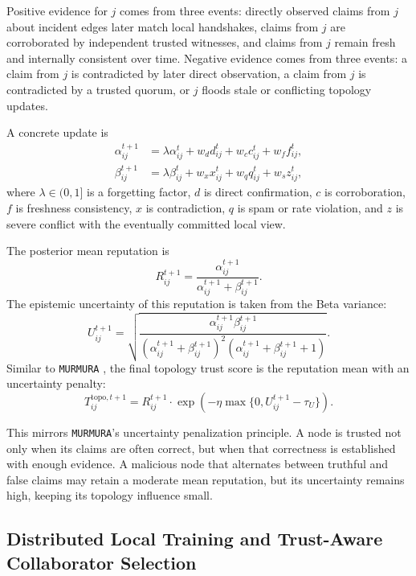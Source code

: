\documentclass[journal]{IEEEtran}
\theoremstyle{definition}
\theoremstyle{remark}
\begin{document}
Positive evidence for $j$ comes from three events: directly observed claims from $j$ about incident edges later match local handshakes, claims from $j$ are corroborated by independent trusted witnesses, and claims from $j$ remain fresh and internally consistent over time. Negative evidence comes from three events: a claim from $j$ is contradicted by later direct observation, a claim from $j$ is contradicted by a trusted quorum, or $j$ floods stale or conflicting topology updates.

A concrete update is
\begin{align}
\alpha_{ij}^{t+1} &= \lambda \alpha_{ij}^t + w_d d_{ij}^t + w_c c_{ij}^t + w_f f_{ij}^t, \\
\beta_{ij}^{t+1}  &= \lambda \beta_{ij}^t + w_x x_{ij}^t + w_q q_{ij}^t + w_s z_{ij}^t,
\end{align}
where $\lambda \in (0, 1]$ is a forgetting factor, $d$ is direct confirmation, $c$ is corroboration, $f$ is freshness consistency, $x$ is contradiction, $q$ is spam or rate violation, and $z$ is severe conflict with the eventually committed local view.

The posterior mean reputation is
\begin{equation}
R_{ij}^{t+1} =
\frac{\alpha_{ij}^{t+1}}{\alpha_{ij}^{t+1} + \beta_{ij}^{t+1}}.
\end{equation}
The epistemic uncertainty of this reputation is taken from the Beta variance:
\begin{equation}
U_{ij}^{t+1} =
\sqrt{
\frac{\alpha_{ij}^{t+1}\beta_{ij}^{t+1}}
{(\alpha_{ij}^{t+1}+\beta_{ij}^{t+1})^2(\alpha_{ij}^{t+1}+\beta_{ij}^{t+1}+1)}
}.
\end{equation}
Similar to \texttt{MURMURA} \cite{rangwala2025evidential}, the final topology trust score is the reputation mean with an uncertainty penalty:
\begin{equation}
T_{ij}^{\text{topo},t+1}
=
R_{ij}^{t+1} \cdot
\exp\!\left(-\eta \max\{0, U_{ij}^{t+1}-\tau_U\}\right).
\end{equation}

This mirrors \texttt{MURMURA}’s uncertainty penalization principle. A node is trusted not only when its claims are often correct, but when that correctness is established with enough evidence. A malicious node that alternates between truthful and false claims may retain a moderate mean reputation, but its uncertainty remains high, keeping its topology influence small.

\subsection{Distributed Local Training and Trust-Aware Collaborator Selection}
\label{sec:collab_score}
\end{document}
